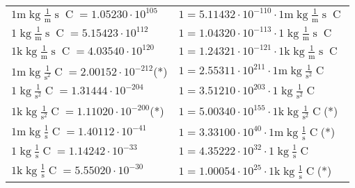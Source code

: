 \begin{center}
\begin{longtable}{l l}
{\color{gray}$1 \bm{\mathrm{ m}}\operatorname{kg}\frac1{\operatorname{m}}{\operatorname{s}}{\operatorname{C}}{} = 1.05230\cdot10^{105} $}   & {\color{gray}$ 1 = 5.11432\cdot10^{-110} \cdot 1 \bm{\mathrm{ m}}\operatorname{kg}\frac1{\operatorname{m}}{\operatorname{s}}{\operatorname{C}}{}$}  \\
{\color{black}$1 \bm{\mathrm{ }}\operatorname{kg}\frac1{\operatorname{m}}{\operatorname{s}}{\operatorname{C}}{} = 5.15423\cdot10^{112} $}   & {\color{black}$ 1 = 1.04320\cdot10^{-113} \cdot 1 \bm{\mathrm{ }}\operatorname{kg}\frac1{\operatorname{m}}{\operatorname{s}}{\operatorname{C}}{}$}  \\
{\color{gray}$1 \bm{\mathrm{ k}}\operatorname{kg}\frac1{\operatorname{m}}{\operatorname{s}}{\operatorname{C}}{} = 4.03540\cdot10^{120} $}   & {\color{gray}$ 1 = 1.24321\cdot10^{-121} \cdot 1 \bm{\mathrm{ k}}\operatorname{kg}\frac1{\operatorname{m}}{\operatorname{s}}{\operatorname{C}}{}$}  \\
{\color{gray}$1 \bm{\mathrm{ m}}\operatorname{kg}{}\frac1{\operatorname{s}^2}{\operatorname{C}}{} = 2.00152\cdot10^{-212} $}\quad(*) & {\color{gray}$ 1 = 2.55311\cdot10^{211} \cdot 1 \bm{\mathrm{ m}}\operatorname{kg}{}\frac1{\operatorname{s}^2}{\operatorname{C}}{}$}  \\
{\color{black}$1 \bm{\mathrm{ }}\operatorname{kg}{}\frac1{\operatorname{s}^2}{\operatorname{C}}{} = 1.31444\cdot10^{-204} $}   & {\color{black}$ 1 = 3.51210\cdot10^{203} \cdot 1 \bm{\mathrm{ }}\operatorname{kg}{}\frac1{\operatorname{s}^2}{\operatorname{C}}{}$}  \\
{\color{gray}$1 \bm{\mathrm{ k}}\operatorname{kg}{}\frac1{\operatorname{s}^2}{\operatorname{C}}{} = 1.11020\cdot10^{-200} $}\quad(*) & {\color{gray}$ 1 = 5.00340\cdot10^{155} \cdot 1 \bm{\mathrm{ k}}\operatorname{kg}{}\frac1{\operatorname{s}^2}{\operatorname{C}}{}$}\quad(*)\\
{\color{gray}$1 \bm{\mathrm{ m}}\operatorname{kg}{}\frac1{\operatorname{s}}{\operatorname{C}}{} = 1.40112\cdot10^{-41} $}   & {\color{gray}$ 1 = 3.33100\cdot10^{40} \cdot 1 \bm{\mathrm{ m}}\operatorname{kg}{}\frac1{\operatorname{s}}{\operatorname{C}}{}$}\quad(*)\\
{\color{black}$1 \bm{\mathrm{ }}\operatorname{kg}{}\frac1{\operatorname{s}}{\operatorname{C}}{} = 1.14242\cdot10^{-33} $}   & {\color{black}$ 1 = 4.35222\cdot10^{32} \cdot 1 \bm{\mathrm{ }}\operatorname{kg}{}\frac1{\operatorname{s}}{\operatorname{C}}{}$}  \\
{\color{gray}$1 \bm{\mathrm{ k}}\operatorname{kg}{}\frac1{\operatorname{s}}{\operatorname{C}}{} = 5.55020\cdot10^{-30} $}   & {\color{gray}$ 1 = 1.00054\cdot10^{25} \cdot 1 \bm{\mathrm{ k}}\operatorname{kg}{}\frac1{\operatorname{s}}{\operatorname{C}}{}$}\quad(*)\\

\end{longtable}
\end{center}
